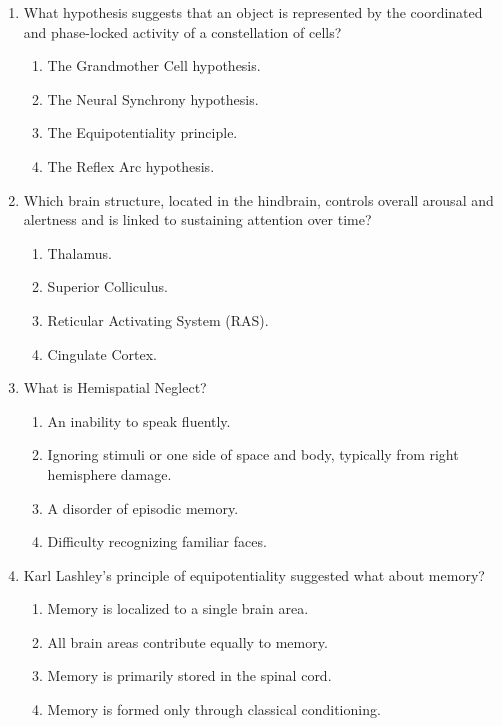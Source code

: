 \documentclass{article}
\begin{document}
\begin{enumerate}[label=\arabic*.]
\item What hypothesis suggests that an object is represented by the coordinated and phase-locked activity of a constellation of cells?
\begin{enumerate}[label=(\alph*)]
    \item The Grandmother Cell hypothesis.
    \item The Neural Synchrony hypothesis.
    \item The Equipotentiality principle.
    \item The Reflex Arc hypothesis.
\end{enumerate}

\item Which brain structure, located in the hindbrain, controls overall arousal and alertness and is linked to sustaining attention over time?
\begin{enumerate}[label=(\alph*)]
    \item Thalamus.
    \item Superior Colliculus.
    \item Reticular Activating System (RAS).
    \item Cingulate Cortex.
\end{enumerate}

\item What is Hemispatial Neglect?
\begin{enumerate}[label=(\alph*)]
    \item An inability to speak fluently.
    \item Ignoring stimuli or one side of space and body, typically from right hemisphere damage.
    \item A disorder of episodic memory.
    \item Difficulty recognizing familiar faces.
\end{enumerate}

\item Karl Lashley's principle of equipotentiality suggested what about memory?
\begin{enumerate}[label=(\alph*)]
    \item Memory is localized to a single brain area.
    \item All brain areas contribute equally to memory.
    \item Memory is primarily stored in the spinal cord.
    \item Memory is formed only through classical conditioning.
\end{enumerate}


\end{enumerate}
\end{document}
